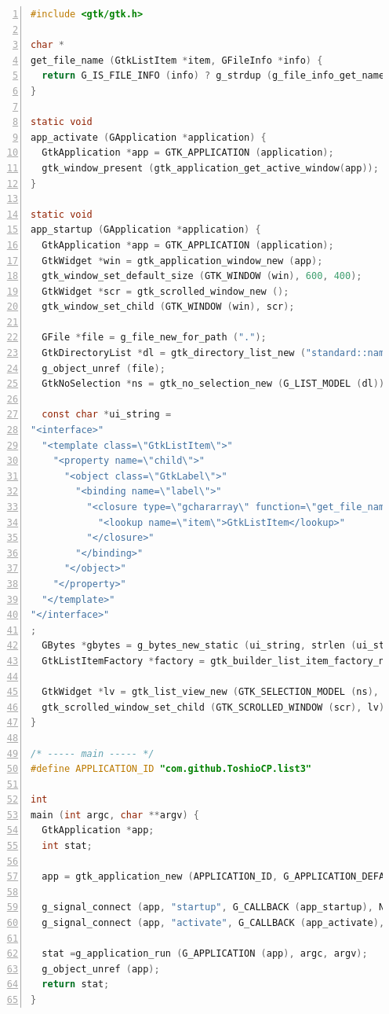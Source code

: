 \begin{lstlisting}[language=C, numbers=left]
#include <gtk/gtk.h>

char *
get_file_name (GtkListItem *item, GFileInfo *info) {
  return G_IS_FILE_INFO (info) ? g_strdup (g_file_info_get_name (info)) : NULL;
}

static void
app_activate (GApplication *application) {
  GtkApplication *app = GTK_APPLICATION (application);
  gtk_window_present (gtk_application_get_active_window(app));
}

static void
app_startup (GApplication *application) {
  GtkApplication *app = GTK_APPLICATION (application);
  GtkWidget *win = gtk_application_window_new (app);
  gtk_window_set_default_size (GTK_WINDOW (win), 600, 400);
  GtkWidget *scr = gtk_scrolled_window_new ();
  gtk_window_set_child (GTK_WINDOW (win), scr);

  GFile *file = g_file_new_for_path (".");
  GtkDirectoryList *dl = gtk_directory_list_new ("standard::name", file);
  g_object_unref (file);
  GtkNoSelection *ns = gtk_no_selection_new (G_LIST_MODEL (dl));

  const char *ui_string =
"<interface>"
  "<template class=\"GtkListItem\">"
    "<property name=\"child\">"
      "<object class=\"GtkLabel\">"
        "<binding name=\"label\">"
          "<closure type=\"gchararray\" function=\"get_file_name\">"
            "<lookup name=\"item\">GtkListItem</lookup>"
          "</closure>"
        "</binding>"
      "</object>"
    "</property>"
  "</template>"
"</interface>"
;
  GBytes *gbytes = g_bytes_new_static (ui_string, strlen (ui_string));
  GtkListItemFactory *factory = gtk_builder_list_item_factory_new_from_bytes (NULL, gbytes);

  GtkWidget *lv = gtk_list_view_new (GTK_SELECTION_MODEL (ns), factory);
  gtk_scrolled_window_set_child (GTK_SCROLLED_WINDOW (scr), lv);
}

/* ----- main ----- */
#define APPLICATION_ID "com.github.ToshioCP.list3"

int
main (int argc, char **argv) {
  GtkApplication *app;
  int stat;

  app = gtk_application_new (APPLICATION_ID, G_APPLICATION_DEFAULT_FLAGS);

  g_signal_connect (app, "startup", G_CALLBACK (app_startup), NULL);
  g_signal_connect (app, "activate", G_CALLBACK (app_activate), NULL);

  stat =g_application_run (G_APPLICATION (app), argc, argv);
  g_object_unref (app);
  return stat;
}
\end{lstlisting}

